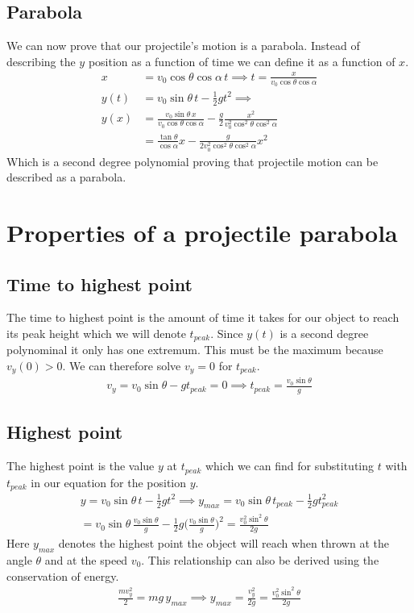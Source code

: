 \documentclass[%
aip,
jmp,
amsmath,amssymb,
reprint,%
]{revtex4-1}
\begin{document}
	\subsection{Parabola}
	We can now prove that our projectile's motion is a parabola. Instead of describing the $y$ position as a function of time we can define it as a function of $x$.
	\begin{align}\nonumber
		x &= v_0 \cos\theta\cos\alpha\,t\implies t = \frac{x}{v_0 \cos\theta\cos\alpha}\\\nonumber
		y(t) &= v_0 \sin\theta\,t - \frac12gt^2 \implies\\\nonumber
		y(x) &= \frac{v_0 \sin\theta\,x}{v_0 \cos\theta\cos\alpha}-\frac{g}{2}\frac{x^2}{v_{0}^2\cos^2\theta\cos^2\alpha}\\\label{eq:yFromX}
		&= \frac{\tan\theta}{\cos\alpha}x - \frac{g}{2v_{0}^2\cos^2\theta\cos^2\alpha} x^2
	\end{align}
	Which is a second degree polynomial proving that projectile motion can be described as a parabola.
	\section{Properties of a projectile parabola}\label{seq:properties}
	\subsection{Time to highest point}
	The time to highest point is the amount of time it takes for our object to reach its peak height which we will denote $t_{peak}$. Since $y(t)$ is a second degree polynominal it only has one extremum. This must be the maximum because $v_y(0) > 0$. We can therefore solve $v_y = 0$ for $t_{peak}$.
	\begin{align}\nonumber
		v_y = v_0\sin\theta - gt_{peak} = 0 \implies t_{peak} = \frac{v_0\sin\theta}{g}
	\end{align}
	\subsection{Highest point}
	The highest point is the value $y$ at $t_{peak}$ which we can find for substituting $t$ with $t_{peak}$ in our equation for the position $y$.
	\begin{align}\nonumber
		y=v_0 \sin\theta\,t - \frac12gt^2 \implies y_{max} = v_0 \sin\theta\,t_{peak} - \frac12gt_{peak}^2\\\nonumber
		= v_0 \sin\theta\,\frac{v_0\sin\theta}{g} - \frac12g\Big({\frac{v_0\sin\theta}{g}}\Big)^2    = \frac{v_{0}^2\sin^2\theta}{2g}\nonumber
	\end{align}
	Here $y_{max}$ denotes the highest point the object will reach when thrown at the angle $\theta$ and at the speed $v_0$. This relationship can also be derived using the conservation of energy.
	\begin{align}\nonumber
		\frac{mv_{y}^2}{2} = mg\,y_{max} \implies y_{max} = \frac{v_{y}^2}{2g} = \frac{v_{0}^2\sin^2\theta}{2g}
	\end{align}
\end{document}
